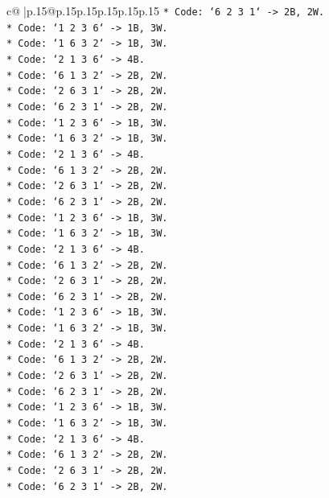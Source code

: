 \documentclass{article}
\begin{document}
{\begin{supertabular}{c@{$\;$}|p{.15\linewidth}@{}p{.15\linewidth}p{.15\linewidth}p{.15\linewidth}p{.15\linewidth}p{.15\linewidth}}
{{{\texttt{*   Code: `6 2 3 1` {-}> 2B, 2W.} \\
\texttt{*   Code: `1 2 3 6` {-}> 1B, 3W.} \\
\texttt{*   Code: `1 6 3 2` {-}> 1B, 3W.} \\
\texttt{*   Code: `2 1 3 6` {-}> 4B.} \\
\texttt{*   Code: `6 1 3 2` {-}> 2B, 2W.} \\
\texttt{*   Code: `2 6 3 1` {-}> 2B, 2W.} \\
\texttt{*   Code: `6 2 3 1` {-}> 2B, 2W.} \\
\texttt{*   Code: `1 2 3 6` {-}> 1B, 3W.} \\
\texttt{*   Code: `1 6 3 2` {-}> 1B, 3W.} \\
\texttt{*   Code: `2 1 3 6` {-}> 4B.} \\
\texttt{*   Code: `6 1 3 2` {-}> 2B, 2W.} \\
\texttt{*   Code: `2 6 3 1` {-}> 2B, 2W.} \\
\texttt{*   Code: `6 2 3 1` {-}> 2B, 2W.} \\
\texttt{*   Code: `1 2 3 6` {-}> 1B, 3W.} \\
\texttt{*   Code: `1 6 3 2` {-}> 1B, 3W.} \\
\texttt{*   Code: `2 1 3 6` {-}> 4B.} \\
\texttt{*   Code: `6 1 3 2` {-}> 2B, 2W.} \\
\texttt{*   Code: `2 6 3 1` {-}> 2B, 2W.} \\
\texttt{*   Code: `6 2 3 1` {-}> 2B, 2W.} \\
\texttt{*   Code: `1 2 3 6` {-}> 1B, 3W.} \\
\texttt{*   Code: `1 6 3 2` {-}> 1B, 3W.} \\
\texttt{*   Code: `2 1 3 6` {-}> 4B.} \\
\texttt{*   Code: `6 1 3 2` {-}> 2B, 2W.} \\
\texttt{*   Code: `2 6 3 1` {-}> 2B, 2W.} \\
\texttt{*   Code: `6 2 3 1` {-}> 2B, 2W.} \\
\texttt{*   Code: `1 2 3 6` {-}> 1B, 3W.} \\
\texttt{*   Code: `1 6 3 2` {-}> 1B, 3W.} \\
\texttt{*   Code: `2 1 3 6` {-}> 4B.} \\
\texttt{*   Code: `6 1 3 2` {-}> 2B, 2W.} \\
\texttt{*   Code: `2 6 3 1` {-}> 2B, 2W.} \\
\texttt{*   Code: `6 2 3 1` {-}> 2B, 2W.} \\
}}}
\end{supertabular}}
\end{document}
